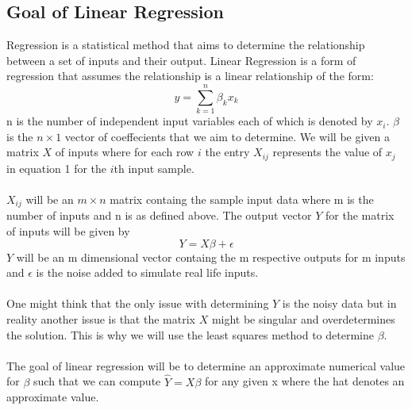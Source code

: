 \subsection{Goal of Linear Regression}
Regression is a statistical method that aims to determine the relationship between a set of inputs and their output.
Linear Regression is a form of regression that assumes the relationship is a linear relationship of the form:
\begin{equation}
    y=\sum_{k=1}^{n} \beta_k x_k
\end{equation}
n is the number of independent input variables each of which is denoted by $x_i$. 
$\beta$ is the $n\times1$ vector of coeffecients that we aim to determine. We will be given a matrix $X$ of inputs where for each row $i$ the entry $X_{ij}$ represents the value of $x_j$ in equation 1 for the $i$th input sample.
\\ \\$X_{ij}$ will be an $m \times{} n$ matrix containg the sample input data where m is the number of inputs and n is as defined above. The output vector $Y$ for the matrix of inputs will be given by \begin{equation}
    Y=X\beta+\epsilon
\end{equation} $Y$ will be an m dimensional vector containg the m respective outputs for m inputs and $\epsilon$ is the noise added to simulate real life inputs. \\ \\
One might think that the only issue with determining $Y$ is the noisy data but in reality another issue is that the matrix $X$ might be singular and overdetermines the solution. This is why we will use the least squares method to determine $\beta$.\\ \\
The goal of linear regression will be to determine an approximate numerical value for $\beta$ such that we can compute $\hat{Y}=X\beta$ for any given x where the hat denotes an approximate value.\\ \\
